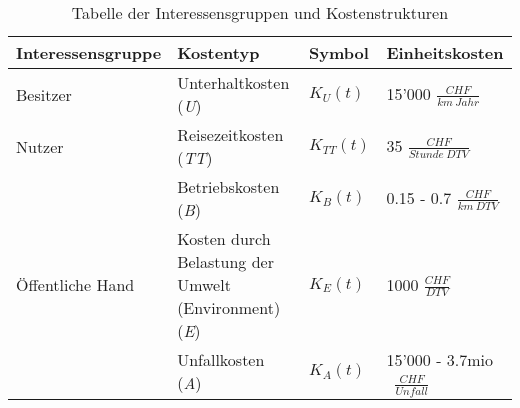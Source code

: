 %
%
%
%

\begin{table}[hbt!]
\flushleft
%
%
\begin{tabular}{@{}p{3.5cm} p{4cm} p{1.35cm} p{4.55cm}@{}} \\   
\toprule
\textbf{Interessensgruppe} & \textbf{Kostentyp} & \textbf{Symbol} & \textbf{Einheitskosten} \\
\midrule
Besitzer                   & Unterhaltkosten (\textit{U})                    & $K_{U}(t)$    & 15'000 $\frac{CHF}{km \ Jahr}$              \\
Nutzer		               & Reisezeitkosten (\textit{TT})                   & $K_{TT}(t)$   & 35 $\frac{CHF}{Stunde \ DTV}$               \\
                           & Betriebskosten (\textit{B})            		 & $K_{B}(t)$    & 0.15 - 0.7 $\frac{CHF}{km \ DTV}$              \\
Öffentliche Hand           & Kosten durch Belastung \newline der Umwelt \newline (Environment) (\textit{E})   & $K_{E}(t)$    & 1000 $\frac{CHF}{DTV}$      \\
                           & Unfallkosten (\textit{A})                       & $K_{A}(t)$    & 15'000 - 3.7mio \ $\frac{CHF}{Unfall}$    \\
\bottomrule

\end{tabular}
\caption{Tabelle der Interessensgruppen und Kostenstrukturen}
\label{tab:t-04-01-Interessensgruppen}
\end{table}


%



